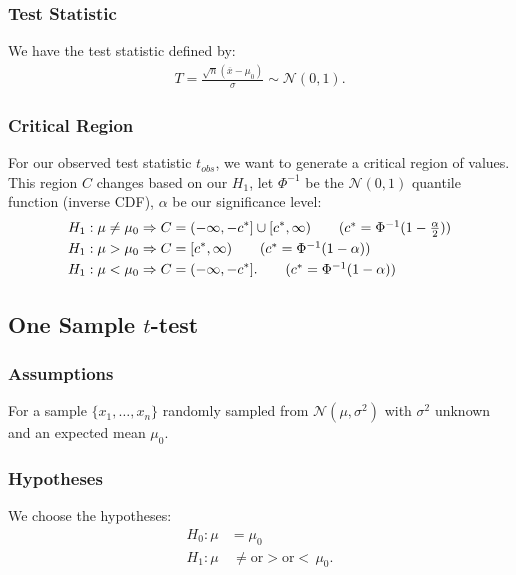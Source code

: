 \documentclass[a4paper, 12pt, twoside]{article}
\begin{document}
\subsubsection{Test Statistic}

We have the test statistic defined by:
\begin{align*}
    T = \frac{\sqrt{n}(\overline{x} - \mu_0)}{\sigma}
    \sim \mathcal{N}(0, 1).
\end{align*}

\subsubsection{Critical Region}

For our observed test statistic $t_{obs}$, we want to generate a
critical region of values. This region $C$ changes based on our
$H_1$, let $\Phi^{-1}$ be the $\mathcal{N}(0, 1)$ quantile function
(inverse CDF), $\alpha$ be our significance level:
\begin{align*}
    H_1 : \mu \neq \mu_0 & \Rightarrow
    C = (-\infty, -c^*] \cup [c^*, \infty)
    \tag{$ c^* = \Phi^{-1}(1 - \frac{\alpha}{2}) $} \\
    H_1 : \mu > \mu_0    & \Rightarrow
    C = [c^*, \infty)
    \tag{$ c^* = \Phi^{-1}(1 - \alpha) $}           \\
    H_1 : \mu < \mu_0    & \Rightarrow
    C = (-\infty, -c^*].
    \tag{$ c^* = \Phi^{-1}(1 - \alpha) $}
\end{align*}

\newpage

\subsection{One Sample $t$-test}

\subsubsection{Assumptions}

For a sample $\{x_1, \ldots, x_n\}$ randomly sampled from
$\mathcal{N}(\mu, \sigma^2)$ with $\sigma^2$ unknown and an
expected mean $\mu_0$.

\subsubsection{Hypotheses}

We choose the hypotheses:
\begin{align*}
    H_0 : \mu & = \mu_0                                   \\
    H_1 : \mu & \, \neq \text{or} > \text{or} < \, \mu_0.
\end{align*}
\end{document}
